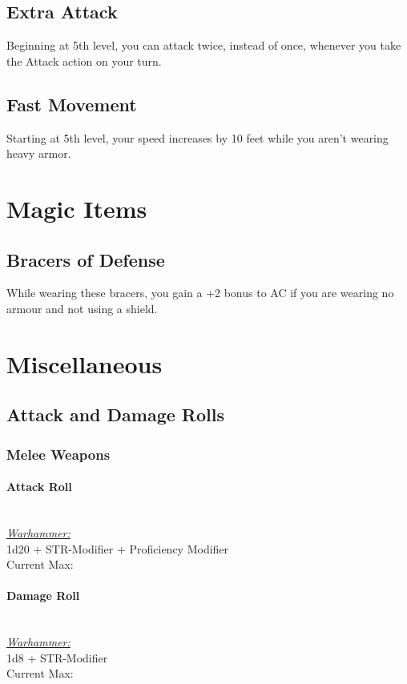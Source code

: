 {\subsection*{Extra Attack}
Beginning at 5th level, you can attack twice, instead of once, whenever you take the Attack action on your turn.
\subsection*{Fast Movement}
Starting at 5th level, your speed increases by 10 feet while you aren't wearing heavy armor.

\section*{Magic Items}
\subsection*{Bracers of Defense}
While wearing these bracers, you gain a +2 bonus to AC if you are wearing no armour and not using a shield.

\section*{Miscellaneous}
\subsection*{Attack and Damage Rolls}
\subsubsection*{Melee Weapons}
\paragraph*{Attack Roll}\hfill\\
\underline{\textit{Warhammer:}}\\
1d20 + STR-Modifier + Proficiency Modifier\\
\indent Current Max: 
\paragraph*{Damage Roll}\hfill\\
\underline{\textit{Warhammer:}}\\
1d8 + STR-Modifier\\
\indent Current Max: 
}
